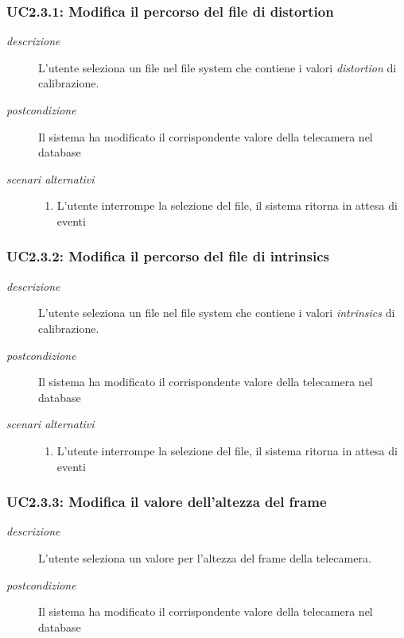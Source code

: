 \subsubsection{UC2.3.1: Modifica il percorso del file di distortion} \label{sec:UC2.3.1}
\begin{description}
\item[\em{descrizione }]L'utente seleziona un file nel file system che contiene i valori \textit{distortion} di calibrazione.
\item[\em{postcondizione }] Il sistema ha modificato il corrispondente valore della telecamera nel database
\item[\em{scenari alternativi }] \mbox{} 
\begin{enumerate} 
\item L'utente interrompe la selezione del file, il sistema ritorna in attesa di eventi
\end{enumerate}
\end{description}

\subsubsection{UC2.3.2: Modifica il percorso del file di intrinsics} \label{sec:UC2.3.2}
\begin{description}
\item[\em{descrizione }]L'utente seleziona un file nel file system che contiene i valori \textit{intrinsics} di calibrazione.
\item[\em{postcondizione }] Il sistema ha modificato il corrispondente valore della telecamera nel database
\item[\em{scenari alternativi }] \mbox{} 
\begin{enumerate} 
\item L'utente interrompe la selezione del file, il sistema ritorna in attesa di eventi
\end{enumerate}
\end{description}

\subsubsection{UC2.3.3: Modifica il valore dell'altezza del frame} \label{sec:UC2.3.3}
\begin{description}
\item[\em{descrizione }]L'utente seleziona un valore per l'altezza del frame della telecamera.
\item[\em{postcondizione }] Il sistema ha modificato il corrispondente valore della telecamera nel database
\end{description}


